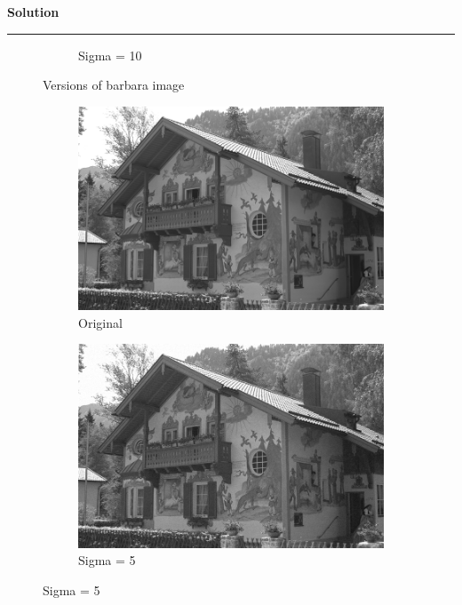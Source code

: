 \documentclass[a4paper]{article}
\newenvironment{solution}[2][]{%
    \begin{mdframed}[linecolor=green!60!black, linewidth=2pt, roundcorner=10pt, backgroundcolor=green!5!white, skipabove=12pt, skipbelow=12pt]%
        \textbf{\large #2} %
        \par\noindent\rule{\textwidth}{0.4pt} %
        \vspace{0.5em} %
}{%
    \end{mdframed}%
}
\begin{document}
\begin{solution}{Solution}
\begin{figure}[H]
\begin{subfigure}[b]{0.3\textwidth}
        \caption{Sigma = 10}
        \label{fig:subfig2}
    \end{subfigure}
    \caption{Versions of barbara image}
    \label{fig:overall}
\end{figure}
\begin{figure}[H]
    \centering
    \begin{subfigure}[b]{0.3\textwidth}
        \centering
        \includegraphics[width=\textwidth]{../images/kodak24.png}
        \caption{Original}
        \label{fig:subfig1}
    \end{subfigure}
    \begin{subfigure}[b]{0.3\textwidth}
        \centering
        \includegraphics[width=\textwidth]{../images/noisy_kodak24_sigma_5.png}
        \caption{Sigma = 5}
        \label{fig:subfig2}
    \end{subfigure}

\end{figure}
\end{solution}
\end{document}
